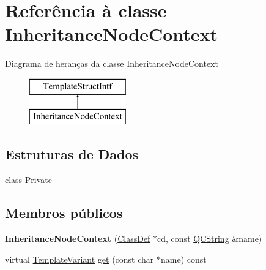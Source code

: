 \hypertarget{class_inheritance_node_context}{\section{Referência à classe Inheritance\-Node\-Context}
\label{class_inheritance_node_context}
}
Diagrama de heranças da classe Inheritance\-Node\-Context\begin{figure}[H]
\begin{center}
\leavevmode
\includegraphics[height=2.000000cm]{class_inheritance_node_context}
\end{center}
\end{figure}
\subsection*{Estruturas de Dados}
\begin{DoxyCompactItemize}
\item 
class \hyperlink{class_inheritance_node_context_1_1_private}{Private}
\end{DoxyCompactItemize}
\subsection*{Membros públicos}
\begin{DoxyCompactItemize}
\item 
\hypertarget{class_inheritance_node_context_a2f53095e845f360303fa62f21e557a3b}{{\bfseries Inheritance\-Node\-Context} (\hyperlink{class_class_def}{Class\-Def} $\ast$cd, const \hyperlink{class_q_c_string}{Q\-C\-String} \&name)}\label{class_inheritance_node_context_a2f53095e845f360303fa62f21e557a3b}

\item 
virtual \hyperlink{class_template_variant}{Template\-Variant} \hyperlink{class_inheritance_node_context_a1bcfea01201f3ea09981a8442842c42d}{get} (const char $\ast$name) const 
\end{DoxyCompactItemize}


